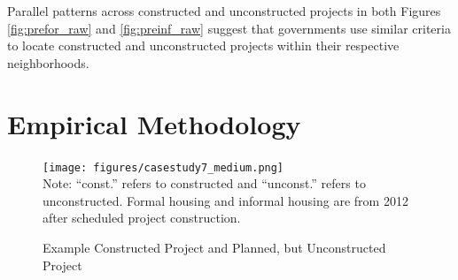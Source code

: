 \documentclass[12pt]{article}
\begin{document}
Parallel patterns across constructed and unconstructed projects in both Figures \ref{fig:prefor_raw} and \ref{fig:preinf_raw} suggest that governments use similar criteria to locate constructed and unconstructed projects within their respective neighborhoods.






\section{Empirical Methodology}\label{section:methodology}

\begin{figure}
\caption{Example Constructed Project and Planned, but Unconstructed Project}\label{fig:bblumaps}
{\centering
\texttt{[image: figures/casestudy7\_medium.png]}}\\[.5em]
{ \footnotesize Note: ``const.'' refers to constructed and ``unconst.'' refers to unconstructed.  Formal housing and informal housing are from 2012 after scheduled project construction. }
\end{figure}
\end{document}

